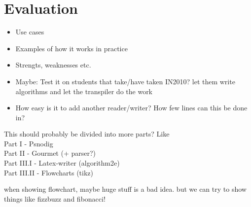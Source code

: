 \chapter{Evaluation}
\begin{itemize}
    \item Use cases
    \item Examples of how it works in practice
    \item Strengts, weaknesses etc.
    \item Maybe: Test it on students that take/have taken IN2010? let them write algorithms and let the transpiler do the work
    \item How easy is it to add another reader/writer? How few lines can this be done in?
\end{itemize}

This should probably be divided into more parts? Like \\

Part I - Psnodig \\
Part II - Gourmet (+ parser?) \\
Part III.I - Latex-writer (algorithm2e) \\
Part III.II - Flowcharts (tikz)


when showing flowchart, maybe huge stuff is a bad idea. but we can try to show things like fizzbuzz and fibonacci!